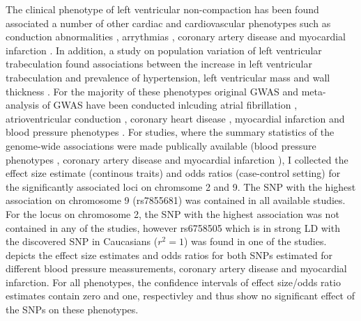 The clinical phenotype of left ventricular non-compaction has been found associated a number of other cardiac and cardiovascular phenotypes such as conduction abnormalities \citep{Yousef2009}, arrythmias \citep{Ritter1997,Oechslin2000,Yousef2009}, coronary artery disease \citep{Ritter1997,Junga1999,Jenni2002,Soler2002} and myocardial infarction \citep{Swinkels2007,Toufan2012,Guvens2012}. In addition, a study on population variation of left ventricular trabeculation found associations between the increase in left ventricular trabeculation and prevalence of hypertension, left ventricular mass and wall thickness \citep{Captur2015}. For the majority of these phenotypes original GWAS and meta-analysis of GWAS have been conducted inlcuding atrial fibrillation \citep{Gudbjartsson2007,Christophersen2017}, atrioventricular conduction \citep{Denny2010}, coronary heart disease \citep{Schunkert2011,Lee2014,Nikpay2015}, myocardial infarction \citep{Kathiresan2009,Hirokakwa2014,Nikpay2015,Dehghan2016} and blood pressure phenotypes \citep{Ehret2009,Wain2011}. For studies, where the summary statistics of the genome-wide associations were made publically available (blood pressure phenotypes \citep{Ehret2009,Wain2011}, coronary artery disease \citep{Schunkert2011} and myocardial infarction \citep{Nikpay2015}), I collected the effect size estimate (continous traits) and odds ratios (case-control setting) for the significantly associated loci on chromsome 2 and 9. The SNP with the highest association on chromosome 9 (rs7855681) was contained in all available studies. For the locus on chromosome 2, the SNP with the highest association was not contained in any of the studies, however rs6758505 which is in strong LD with the discovered SNP in Caucasians (\(r^2=1\)) was found in one of the studies.  depicts the effect size estimates and odds ratios for both SNPs estimated for different blood pressure meassurements, coronary artery disease and myocardial infarction. For all phenotypes, the confidence intervals of effect size/odds ratio estimates contain zero and one, respectivley and thus show no significant effect of the SNPs on these phenotypes. 

